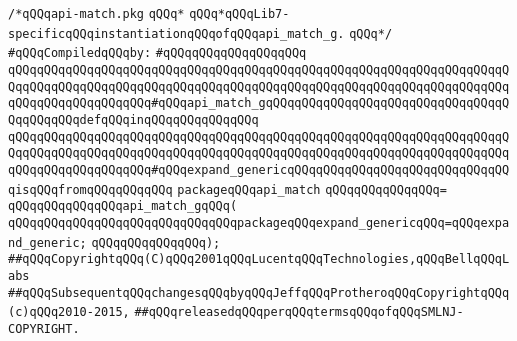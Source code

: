 \label{src/lib/compiler/front/semantic/modules/api-match.pkg}
\verb|/*qQQqapi-match.pkg|\newline
\verb|qQQq*|\newline
\verb|qQQq*qQQqLib7-specificqQQqinstantiationqQQqofqQQqapi_match_g.|\newline
\verb|qQQq*/|\newline
\newline
\verb|#qQQqCompiledqQQqby:|\newline
\verb|#qQQqqQQqqQQqqQQqqQQq|\newline
\newline
\verb|qQQqqQQqqQQqqQQqqQQqqQQqqQQqqQQqqQQqqQQqqQQqqQQqqQQqqQQqqQQqqQQqqQQqqQQqqQQqqQQqqQQqqQQqqQQqqQQqqQQqqQQqqQQqqQQqqQQqqQQqqQQqqQQqqQQqqQQqqQQqqQQqqQQqqQQqqQQqqQQq#qQQqapi_match_gqQQqqQQqqQQqqQQqqQQqqQQqqQQqqQQqqQQqqQQqqQQqdefqQQqinqQQqqQQqqQQqqQQq|\newline
\verb|qQQqqQQqqQQqqQQqqQQqqQQqqQQqqQQqqQQqqQQqqQQqqQQqqQQqqQQqqQQqqQQqqQQqqQQqqQQqqQQqqQQqqQQqqQQqqQQqqQQqqQQqqQQqqQQqqQQqqQQqqQQqqQQqqQQqqQQqqQQqqQQqqQQqqQQqqQQqqQQq#qQQqexpand_genericqQQqqQQqqQQqqQQqqQQqqQQqqQQqqQQqisqQQqfromqQQqqQQqqQQq|\newline
\verb|packageqQQqapi_match|\newline
\verb|qQQqqQQqqQQqqQQq=|\newline
\verb|qQQqqQQqqQQqqQQqapi_match_gqQQq(|\newline
\verb|qQQqqQQqqQQqqQQqqQQqqQQqqQQqqQQqpackageqQQqexpand_genericqQQq=qQQqexpand_generic;|\newline
\verb|qQQqqQQqqQQqqQQq);|\newline
\newline
\newline
\newline
\verb|##qQQqCopyrightqQQq(C)qQQq2001qQQqLucentqQQqTechnologies,qQQqBellqQQqLabs|\newline
\verb|##qQQqSubsequentqQQqchangesqQQqbyqQQqJeffqQQqProtheroqQQqCopyrightqQQq(c)qQQq2010-2015,|\newline
\verb|##qQQqreleasedqQQqperqQQqtermsqQQqofqQQqSMLNJ-COPYRIGHT.|\newline
\newline

